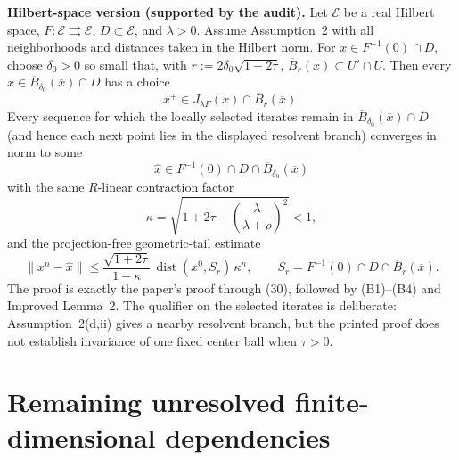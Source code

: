 \documentclass[11pt]{article}
\newenvironment{improved}{\par\begingroup\color{red}}{\par\endgroup}
\newcommand{\E}{\mathcal E}
\newcommand{\dist}{\operatorname{dist}}
\newcommand{\barx}{\overline{x}}
\newcommand{\bx}{\widehat{x}}
\begin{document}
\begin{improved}
\textbf{Hilbert-space version (supported by the audit).} Let \(\E\) be a real Hilbert space, \(F:\E\rightrightarrows\E\), \(D\subset\E\), and \(\lambda>0\). Assume Assumption~2 with all neighborhoods and distances taken in the Hilbert norm. For \(\barx\in F^{-1}(0)\cap D\), choose \(\delta_0>0\) so small that, with \(r:=2\delta_0\sqrt{1+2\tau}\), \(\overline B_r(\barx)\subset U'\cap U\). Then every \(x\in\overline B_{\delta_0}(\barx)\cap D\) has a choice
\[
x^+\in J_{\lambda F}(x)\cap\overline B_r(\barx).
\]
Every sequence for which the locally selected iterates remain in \(\overline B_{\delta_0}(\barx)\cap D\) (and hence each next point lies in the displayed resolvent branch) converges in norm to some
\[
\bx\in F^{-1}(0)\cap D\cap\overline B_{\delta_0}(\barx)
\]
with the same \(R\)-linear contraction factor
\[
\kappa=\sqrt{1+2\tau-\left(\frac{\lambda}{\lambda+\rho}\right)^2}<1,
\]
and the projection-free geometric-tail estimate
\[
 \|x^n-\bx\|\le \frac{\sqrt{1+2\tau}}{1-\kappa}\,\dist(x^0,S_r)\,\kappa^n,
 \qquad S_r=F^{-1}(0)\cap D\cap\overline B_r(\barx).
\]
The proof is exactly the paper's proof through (30), followed by (B1)--(B4) and Improved Lemma~2. The qualifier on the selected iterates is deliberate: Assumption~2(d,ii) gives a nearby resolvent branch, but the printed proof does not establish invariance of one fixed center ball when \(\tau>0\).
\end{improved}

\section{Remaining unresolved finite-dimensional dependencies}
\end{document}
